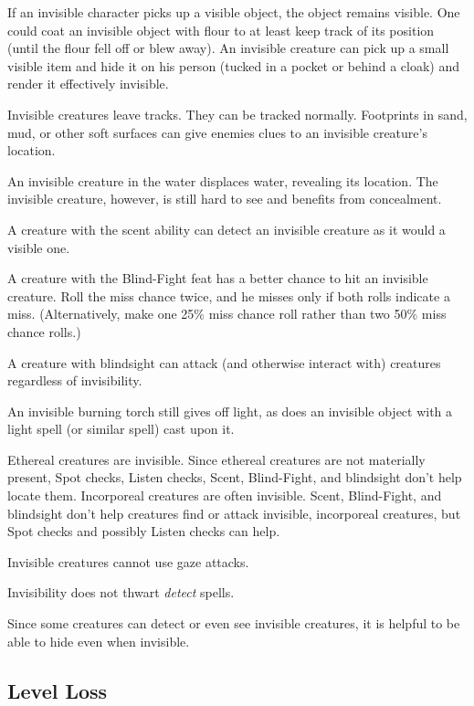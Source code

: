If an invisible character picks up a visible object, the object remains visible. 
One could coat an invisible object with flour to at least keep track of its position 
(until the flour fell off or blew away). An invisible creature can pick up a small 
visible item and hide it on his person (tucked in a pocket or behind a cloak) and 
render it effectively invisible. 

Invisible creatures leave tracks. They can be tracked normally. Footprints in sand, 
mud, or other soft surfaces can give enemies clues to an invisible creature's location.

An invisible creature in the water displaces water, revealing its location. The 
invisible creature, however, is still hard to see and benefits from concealment.

A creature with the scent ability can detect an invisible creature as it would 
a visible one.

A creature with the Blind-Fight feat has a better chance to hit an invisible creature. 
Roll the miss chance twice, and he misses only if both rolls indicate a miss. (Alternatively, 
make one 25\% miss chance roll rather than two 50\% miss chance rolls.)

A creature with blindsight can attack (and otherwise interact with) creatures regardless 
of invisibility.

An invisible burning torch still gives off light, as does an invisible object with 
a light spell (or similar spell) cast upon it.

Ethereal creatures are invisible. Since ethereal creatures are not materially present, 
Spot checks, Listen checks, Scent, Blind-Fight, and blindsight don't help locate 
them. Incorporeal creatures are often invisible. Scent, Blind-Fight, and blindsight 
don't help creatures find or attack invisible, incorporeal creatures, but Spot 
checks and possibly Listen checks can help.

Invisible creatures cannot use gaze attacks.

Invisibility does not thwart \textit{detect} spells.

Since some creatures can detect or even see invisible creatures, it is helpful 
to be able to hide even when invisible.

\subsection{Level Loss}

